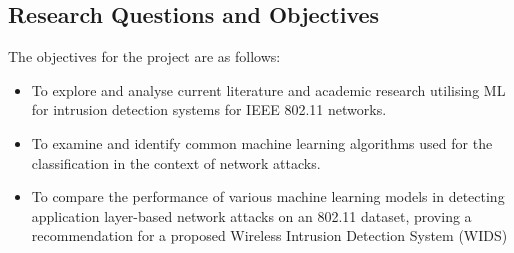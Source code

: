 \subsection{Research Questions and Objectives}
\label{sec:Research Question}

The objectives for the project are as follows:
\begin{itemize}
\item To explore and analyse current literature and academic research utilising ML for intrusion detection systems for IEEE 802.11 networks.
\end{itemize}
\begin{itemize}
\item To examine and identify common machine learning algorithms used for the classification in the context of network attacks.
\end{itemize}
\begin{itemize}
\item To compare the performance of various machine learning models in detecting application layer-based network attacks on an 802.11 dataset, proving a recommendation for a proposed Wireless Intrusion Detection System (WIDS)
\end{itemize}

